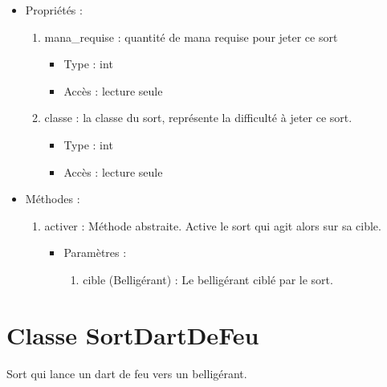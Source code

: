 \documentclass[12pt,pdftex,oneside]{article}
\begin{document}
  \begin{itemize}
  \item Propriétés : 
    \begin{enumerate}
    \item mana\_requise : quantité de mana requise pour jeter ce sort
          \begin{itemize}
          \item Type : int
          \item Accès : lecture seule
          \end{itemize}
    \item classe : la classe du sort, représente la difficulté à jeter ce sort.
          \begin{itemize}
          \item Type : int
          \item Accès : lecture seule
          \end{itemize}

    \end{enumerate}

  \item Méthodes : 

    \begin{enumerate}
    \item activer : Méthode abstraite. Active le sort qui agit alors sur sa cible.
      \begin{itemize}
      \item Paramètres : 
        \begin{enumerate}
        \item cible (Belligérant) : Le belligérant ciblé par le sort.
        \end{enumerate}
      \end{itemize}
    \end{enumerate}

  \end{itemize}

  \section {Classe SortDartDeFeu}

  Sort qui lance un dart de feu vers un belligérant.
\end{document}
